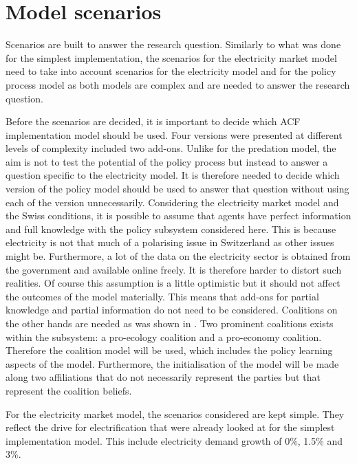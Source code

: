 \documentclass[12pt]{article}
\begin{document}
\section{Model scenarios}
\label{sec:steps}

Scenarios are built to answer the research question. Similarly to what was done for the simplest implementation, the scenarios for the electricity market model need to take into account scenarios for the electricity model and for the policy process model as both models are complex and are needed to answer the research question.

Before the scenarios are decided, it is important to decide which ACF implementation model should be used. Four versions were presented at different levels of complexity included two add-ons. Unlike for the predation model, the aim is not to test the potential of the policy process but instead to answer a question specific to the electricity model. It is therefore needed to decide which version of the policy model should be used to answer that question without using each of the version unnecessarily. Considering the electricity market model and the Swiss conditions, it is possible to assume that agents have perfect information and full knowledge with the policy subsystem considered here. This is because electricity is not that much of a polarising issue in Switzerland as other issues might be. Furthermore, a lot of the data on the electricity sector is obtained from the government and available online freely. It is therefore harder to distort such realities. Of course this assumption is a little optimistic but it should not affect the outcomes of the model materially. This means that add-ons for partial knowledge and partial information do not need to be considered. Coalitions on the other hands are needed as was shown in \cite{markard2016socio}. Two prominent coalitions exists within the subsystem: a pro-ecology coalition and a pro-economy coalition. Therefore the coalition model will be used, which includes the policy learning aspects of the model. Furthermore, the initialisation of the model will be made along two affiliations that do not necessarily represent the parties but that represent the coalition beliefs.

For the electricity market model, the scenarios considered are kept simple. They reflect the drive for electrification that were already looked at for the simplest implementation model. This include electricity demand growth of 0\%, 1.5\% and 3\%.
\end{document}
